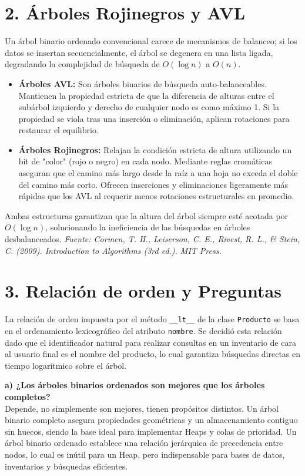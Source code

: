 \documentclass[12pt, letterpaper]{article}
\begin{document}
\section*{2. Árboles Rojinegros y AVL}
Un árbol binario ordenado convencional carece de mecanismos de balanceo; si los datos se insertan secuencialmente, el árbol se degenera en una lista ligada, degradando la complejidad de búsqueda de $O(\log n)$ a $O(n)$.
\begin{itemize}
    \item \textbf{Árboles AVL:} Son árboles binarios de búsqueda auto-balanceables. Mantienen la propiedad estricta de que la diferencia de alturas entre el subárbol izquierdo y derecho de cualquier nodo es como máximo 1. Si la propiedad se viola tras una inserción o eliminación, aplican rotaciones para restaurar el equilibrio.
    \item \textbf{Árboles Rojinegros:} Relajan la condición estricta de altura utilizando un bit de "color" (rojo o negro) en cada nodo. Mediante reglas cromáticas aseguran que el camino más largo desde la raíz a una hoja no exceda el doble del camino más corto. Ofrecen inserciones y eliminaciones ligeramente más rápidas que los AVL al requerir menos rotaciones estructurales en promedio.
\end{itemize}
Ambas estructuras garantizan que la altura del árbol siempre esté acotada por $O(\log n)$, solucionando la ineficiencia de las búsquedas en árboles desbalanceados.
\textit{Fuente: Cormen, T. H., Leiserson, C. E., Rivest, R. L., \& Stein, C. (2009). Introduction to Algorithms (3rd ed.). MIT Press.}

\section*{3. Relación de orden y Preguntas}
La relación de orden impuesta por el método \texttt{\_\_lt\_\_} de la clase \texttt{Producto} se basa en el ordenamiento lexicográfico del atributo \texttt{nombre}. Se decidió esta relación dado que el identificador natural para realizar consultas en un inventario de cara al usuario final es el nombre del producto, lo cual garantiza búsquedas directas en tiempo logarítmico sobre el árbol.

\textbf{a) ¿Los árboles binarios ordenados son mejores que los árboles completos?} \\
Depende, no simplemente son mejores, tienen propósitos distintos. Un árbol binario completo asegura propiedades geométricas y un almacenamiento contiguo sin huecos, siendo la base ideal para implementar Heaps y colas de prioridad. Un árbol binario ordenado establece una relación jerárquica de precedencia entre nodos, lo cual es inútil para un Heap, pero indispensable para bases de datos, inventarios y búsquedas eficientes. 
\end{document}
